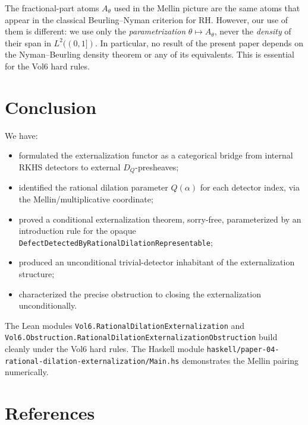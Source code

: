 \documentclass[12pt]{article}
\theoremstyle{plain}
\theoremstyle{definition}
\theoremstyle{remark}
\newcommand{\DQ}{D_{Q}}
\begin{document}
The fractional-part atoms $A_\theta$ used in the Mellin picture are the
same atoms that appear in the classical Beurling--Nyman criterion for
RH.  However, our use of them is different: we use only the
\emph{parametrization} $\theta\mapsto A_\theta$, never the
\emph{density} of their span in $L^{2}((0,1])$.  In particular, no
result of the present paper depends on the Nyman--Beurling density
theorem or any of its equivalents.  This is essential for the Vol6
hard rules.

\section{Conclusion}
\label{sec:conclusion}

We have:
\begin{itemize}
  \item formulated the externalization functor as a categorical
    bridge from internal RKHS detectors to external $\DQ$-presheaves;
  \item identified the rational dilation parameter $Q(\alpha)$ for
    each detector index, via the Mellin/multiplicative coordinate;
  \item proved a conditional externalization theorem, sorry-free,
    parameterized by an introduction rule for the opaque
    \texttt{DefectDetectedByRationalDilationRepresentable};
  \item produced an unconditional trivial-detector inhabitant of the
    externalization structure;
  \item characterized the precise obstruction to closing the
    externalization unconditionally.
\end{itemize}
The Lean modules
\texttt{Vol6.RationalDilationExternalization} and
\texttt{Vol6.Obstruction.RationalDilationExternalizationObstruction}
build cleanly under the Vol6 hard rules.  The Haskell module
\texttt{haskell/paper-04-rational-dilation-externalization/Main.hs}
demonstrates the Mellin pairing numerically.

\section*{References}
\end{document}
